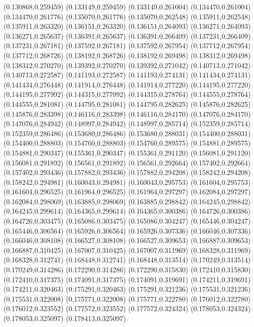 (0.130868,0.259459)
(0.133149,0.259459)
(0.133149,0.261004)
(0.134470,0.261004)
(0.134470,0.261776)
(0.135070,0.261776)
(0.135070,0.262548)
(0.135911,0.262548)
(0.135911,0.263320)
(0.136151,0.263320)
(0.136151,0.264093)
(0.136271,0.264093)
(0.136271,0.265637)
(0.136391,0.265637)
(0.136391,0.266409)
(0.137231,0.266409)
(0.137231,0.267181)
(0.137592,0.267181)
(0.137592,0.267954)
(0.137712,0.267954)
(0.137712,0.268726)
(0.138192,0.268726)
(0.138192,0.269498)
(0.138312,0.269498)
(0.138312,0.270270)
(0.139392,0.270270)
(0.139392,0.271042)
(0.140713,0.271042)
(0.140713,0.272587)
(0.141193,0.272587)
(0.141193,0.274131)
(0.141434,0.274131)
(0.141434,0.276448)
(0.141914,0.276448)
(0.141914,0.277220)
(0.144195,0.277220)
(0.144195,0.277992)
(0.144315,0.277992)
(0.144315,0.278764)
(0.144555,0.278764)
(0.144555,0.281081)
(0.144795,0.281081)
(0.144795,0.282625)
(0.145876,0.282625)
(0.145876,0.283398)
(0.146116,0.283398)
(0.146116,0.284170)
(0.147076,0.284170)
(0.147076,0.284942)
(0.148997,0.284942)
(0.148997,0.285714)
(0.152359,0.285714)
(0.152359,0.286486)
(0.153680,0.286486)
(0.153680,0.288031)
(0.154400,0.288031)
(0.154400,0.288803)
(0.154760,0.288803)
(0.154760,0.289575)
(0.154881,0.289575)
(0.154881,0.290347)
(0.155361,0.290347)
(0.155361,0.291120)
(0.156081,0.291120)
(0.156081,0.291892)
(0.156561,0.291892)
(0.156561,0.292664)
(0.157402,0.292664)
(0.157402,0.293436)
(0.157882,0.293436)
(0.157882,0.294208)
(0.158242,0.294208)
(0.158242,0.294981)
(0.160043,0.294981)
(0.160043,0.295753)
(0.161604,0.295753)
(0.161604,0.296525)
(0.161964,0.296525)
(0.161964,0.297297)
(0.162084,0.297297)
(0.162084,0.298069)
(0.163885,0.298069)
(0.163885,0.298842)
(0.164245,0.298842)
(0.164245,0.299614)
(0.164365,0.299614)
(0.164365,0.300386)
(0.164726,0.300386)
(0.164726,0.303475)
(0.165086,0.303475)
(0.165086,0.304247)
(0.165446,0.304247)
(0.165446,0.306564)
(0.165926,0.306564)
(0.165926,0.307336)
(0.166046,0.307336)
(0.166046,0.308108)
(0.166527,0.308108)
(0.166527,0.309653)
(0.166887,0.309653)
(0.166887,0.310425)
(0.167007,0.310425)
(0.167007,0.311969)
(0.168328,0.311969)
(0.168328,0.312741)
(0.168448,0.312741)
(0.168448,0.313514)
(0.170249,0.313514)
(0.170249,0.314286)
(0.172290,0.314286)
(0.172290,0.315830)
(0.172410,0.315830)
(0.172410,0.317375)
(0.174091,0.317375)
(0.174091,0.319691)
(0.174211,0.319691)
(0.174211,0.320463)
(0.175291,0.320463)
(0.175291,0.321236)
(0.175531,0.321236)
(0.175531,0.322008)
(0.175771,0.322008)
(0.175771,0.322780)
(0.176012,0.322780)
(0.176012,0.323552)
(0.177572,0.323552)
(0.177572,0.324324)
(0.178053,0.324324)
(0.178053,0.325097)
(0.178413,0.325097)
